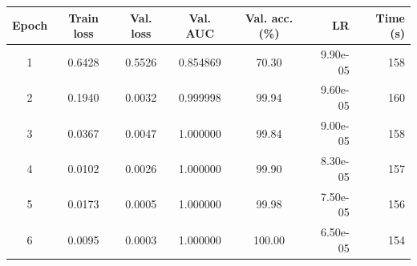 \begin{tabular}{@{}cccccrr@{}}
\toprule
Epoch & Train loss & Val. loss & Val. AUC & Val. acc. (\%) & LR & Time (s)\\
\midrule
1 & 0.6428 & 0.5526 & 0.854869 & 70.30 & 9.90e-05 & 158 \\
2 & 0.1940 & 0.0032 & 0.999998 & 99.94 & 9.60e-05 & 160 \\
3 & 0.0367 & 0.0047 & 1.000000 & 99.84 & 9.00e-05 & 158 \\
4 & 0.0102 & 0.0026 & 1.000000 & 99.90 & 8.30e-05 & 157 \\
5 & 0.0173 & 0.0005 & 1.000000 & 99.98 & 7.50e-05 & 156 \\
6 & 0.0095 & 0.0003 & 1.000000 & 100.00 & 6.50e-05 & 154 \\
\bottomrule
\end{tabular}
